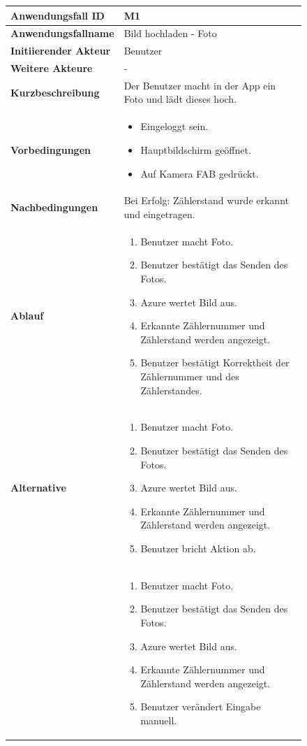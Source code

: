 \newpage

\begin{figure}[h]
	\centering
	\begin{tabularx}{\textwidth}{ X | X }
		\textbf{Anwendungsfall ID} & M1 \\ \hline
		\textbf{Anwendungsfallname} & Bild hochladen  - Foto \\ \hline
		\textbf{Initiierender Akteur} & Benutzer \\ \hline
		\textbf{Weitere Akteure} & - \\ \hline
		\textbf{Kurzbeschreibung} & Der Benutzer macht in der App ein Foto und lädt dieses hoch.   \\ \hline
		\textbf{Vorbedingungen} & 
		\begin {itemize}
			\item Eingeloggt sein. 
			\item Hauptbildschirm geöffnet.
			\item Auf Kamera FAB gedrückt.
		\end{itemize} \\ \hline
		\textbf{Nachbedingungen} & Bei Erfolg: Zählerstand wurde erkannt und eingetragen. \\ \hline
		\textbf{Ablauf} &
		\begin{enumerate}
			\item Benutzer macht Foto.
			\item Benutzer bestätigt das Senden des Fotos.
			\item Azure wertet Bild aus.
			\item Erkannte Zählernummer und Zählerstand werden angezeigt.
			\item Benutzer bestätigt Korrektheit der Zählernummer und des Zählerstandes.
		\end{enumerate} \\ \hline
		\textbf{Alternative} &
		\begin{enumerate}
			\item Benutzer macht Foto.
			\item Benutzer bestätigt das Senden des Fotos.
			\item Azure wertet Bild aus.
			\item Erkannte Zählernummer und Zählerstand werden angezeigt.
			\item Benutzer bricht Aktion ab.
		\end{enumerate} \\ &
		\begin{enumerate}
			\item Benutzer macht Foto.
			\item Benutzer bestätigt das Senden des Fotos.
			\item Azure wertet Bild aus.
			\item Erkannte Zählernummer und Zählerstand werden angezeigt.
			\item Benutzer verändert Eingabe manuell.
		\end{enumerate} \\


	\end{tabularx}
\end{figure}

